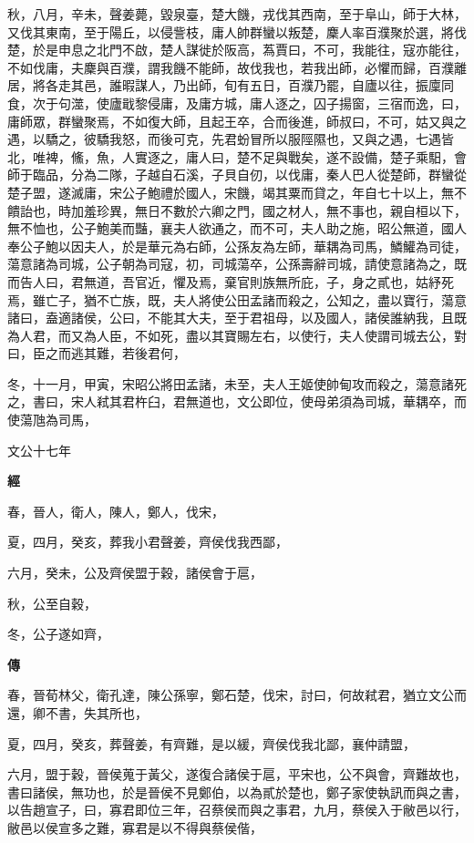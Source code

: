 \documentclass{ctexart}
\begin{document}
秋，八月，辛未，聲姜薨，毀泉臺，楚大饑，戎伐其西南，至于阜山，師于大林，又伐其東南，至于陽丘，以侵訾枝，庸人帥群蠻以叛楚，麇人率百濮聚於選，將伐楚，於是申息之北門不啟，楚人謀徙於阪高，蒍賈曰，不可，我能往，寇亦能往，不如伐庸，夫麇與百濮，謂我饑不能師，故伐我也，若我出師，必懼而歸，百濮離居，將各走其邑，誰暇謀人，乃出師，旬有五日，百濮乃罷，自廬以往，振廩同食，次于句澨，使廬戢黎侵庸，及庸方城，庸人逐之，囚子揚窗，三宿而逸，曰，庸師眾，群蠻聚焉，不如復大師，且起王卒，合而後進，師叔曰，不可，姑又與之遇，以驕之，彼驕我怒，而後可克，先君蚡冒所以服陘隰也，又與之遇，七遇皆北，唯裨，鯈，魚，人實逐之，庸人曰，楚不足與戰矣，遂不設備，楚子乘馹，會師于臨品，分為二隊，子越自石溪，子貝自仞，以伐庸，秦人巴人從楚師，群蠻從楚子盟，遂滅庸，宋公子鮑禮於國人，宋饑，竭其粟而貸之，年自七十以上，無不饋詒也，時加羞珍異，無日不數於六卿之門，國之材人，無不事也，親自桓以下，無不恤也，公子鮑美而豔，襄夫人欲通之，而不可，夫人助之施，昭公無道，國人奉公子鮑以因夫人，於是華元為右師，公孫友為左師，華耦為司馬，鱗鱹為司徒，蕩意諸為司城，公子朝為司寇，初，司城蕩卒，公孫壽辭司城，請使意諸為之，既而告人曰，君無道，吾官近，懼及焉，棄官則族無所庇，子，身之貳也，姑紓死焉，雖亡子，猶不亡族，既，夫人將使公田孟諸而殺之，公知之，盡以寶行，蕩意諸曰，盍適諸侯，公曰，不能其大夫，至于君祖母，以及國人，諸侯誰納我，且既為人君，而又為人臣，不如死，盡以其寶賜左右，以使行，夫人使謂司城去公，對曰，臣之而逃其難，若後君何，

冬，十一月，甲寅，宋昭公將田孟諸，未至，夫人王姬使帥甸攻而殺之，蕩意諸死之，書曰，宋人弒其君杵臼，君無道也，文公即位，使母弟須為司城，華耦卒，而使蕩虺為司馬，





文公十七年


\textbf{經}



春，晉人，衛人，陳人，鄭人，伐宋，

夏，四月，癸亥，葬我小君聲姜，齊侯伐我西鄙，

六月，癸未，公及齊侯盟于穀，諸侯會于扈，

秋，公至自穀，

冬，公子遂如齊，

\textbf{傳}



春，晉荀林父，衛孔達，陳公孫寧，鄭石楚，伐宋，討曰，何故弒君，猶立文公而還，卿不書，失其所也，

夏，四月，癸亥，葬聲姜，有齊難，是以緩，齊侯伐我北鄙，襄仲請盟，

六月，盟于穀，晉侯蒐于黃父，遂復合諸侯于扈，平宋也，公不與會，齊難故也，書曰諸侯，無功也，於是晉侯不見鄭伯，以為貳於楚也，鄭子家使執訊而與之書，以告趙宣子，曰，寡君即位三年，召蔡侯而與之事君，九月，蔡侯入于敝邑以行，敝邑以侯宣多之難，寡君是以不得與蔡侯偕，
\end{document}
